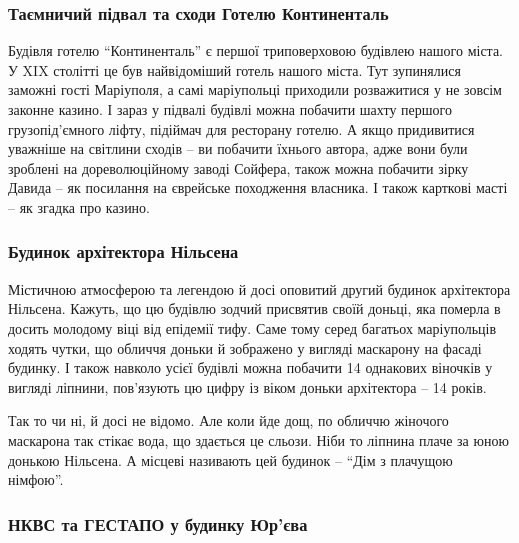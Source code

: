 \subsubsection{Таємничий підвал та сходи Готелю Континенталь}


Будівля готелю \enquote{Континенталь} є першої триповерховою будівлею нашого міста. У
XIX столітті це був найвідоміший готель нашого міста. Тут зупинялися заможні
гості Маріуполя, а самі маріупольці приходили розважитися у не зовсім законне
казино. І зараз у підвалі будівлі можна побачити шахту першого грузопід'ємного
ліфту, підіймач для ресторану готелю. А якщо придивитися уважніше на світлини
сходів – ви побачити їхнього автора, адже вони були зроблені на дореволюційному
заводі Сойфера, також можна побачити зірку Давида – як посилання на єврейське
походження власника. І також карткові масті – як згадка про казино.


\subsubsection{Будинок архітектора Нільсена}


Містичною атмосферою та легендою й досі оповитий другий будинок архітектора
Нільсена. Кажуть, що цю будівлю зодчий присвятив своїй доньці, яка померла в
досить молодому віці від епідемії тифу. Саме тому серед багатьох маріупольців
ходять чутки, що обличчя доньки й зображено у вигляді маскарону на фасаді
будинку. І також навколо усієї будівлі можна побачити 14 однакових віночків у
вигляді ліпнини, пов'язують цю цифру із віком доньки архітектора – 14 років.

Так то чи ні, й досі не відомо. Але коли йде дощ, по обличчю жіночого маскарона
так стікає вода, що здається це сльози. Ніби то ліпнина плаче за юною донькою
Нільсена. А місцеві називають цей будинок – \enquote{Дім з плачущою німфою}.

\subsubsection{НКВС та ГЕСТАПО у будинку Юр'єва}

